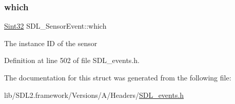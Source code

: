 \subsubsection{\texorpdfstring{which}{which}}
{\footnotesize\ttfamily \mbox{\hyperlink{_s_d_l__stdinc_8h_a7a90b941db9d4582e9ad7abb9940ff7e}{Sint32}} S\+D\+L\+\_\+\+Sensor\+Event\+::which}

The instance ID of the sensor 

Definition at line 502 of file S\+D\+L\+\_\+events.\+h.



The documentation for this struct was generated from the following file\+:\begin{DoxyCompactItemize}
\item 
lib/\+S\+D\+L2.\+framework/\+Versions/\+A/\+Headers/\mbox{\hyperlink{_s_d_l__events_8h}{S\+D\+L\+\_\+events.\+h}}\end{DoxyCompactItemize}
